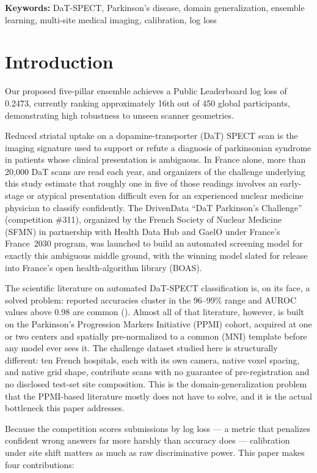 \documentclass[11pt]{article}
\begin{document}
\noindent\textbf{Keywords:} DaT-SPECT, Parkinson's disease, domain generalization, ensemble learning, multi-site medical imaging, calibration, log loss

\section{Introduction}

Our proposed five-pillar ensemble achieves a Public Leaderboard log loss of 0.2473, currently ranking approximately 16th out of 450 global participants, demonstrating high robustness to unseen scanner geometries.
\label{sec:intro}

Reduced striatal uptake on a dopamine-transporter (DaT) SPECT scan is the imaging signature used to support or refute a diagnosis of parkinsonian syndrome in patients whose clinical presentation is ambiguous. In France alone, more than 20{,}000 DaT scans are read each year, and organizers of the challenge underlying this study estimate that roughly one in five of those readings involves an early-stage or atypical presentation difficult even for an experienced nuclear medicine physician to classify confidently. The DrivenData ``DaT Parkinson's Challenge'' (competition \#311), organized by the French Society of Nuclear Medicine (SFMN) in partnership with Health Data Hub and GaelO under France's France~2030 program, was launched to build an automated screening model for exactly this ambiguous middle ground, with the winning model slated for release into France's open health-algorithm library (BOAS).

The scientific literature on automated DaT-SPECT classification is, on its face, a solved problem: reported accuracies cluster in the 96--99\% range and AUROC values above 0.98 are common (). Almost all of that literature, however, is built on the Parkinson's Progression Markers Initiative (PPMI) cohort, acquired at one or two centers and spatially pre-normalized to a common (MNI) template before any model ever sees it. The challenge dataset studied here is structurally different: ten French hospitals, each with its own camera, native voxel spacing, and native grid shape, contribute scans with no guarantee of pre-registration and no disclosed test-set site composition. This is the domain-generalization problem that the PPMI-based literature mostly does not have to solve, and it is the actual bottleneck this paper addresses.

Because the competition scores submissions by log loss --- a metric that penalizes confident wrong answers far more harshly than accuracy does --- calibration under site shift matters as much as raw discriminative power. This paper makes four contributions:
\end{document}
